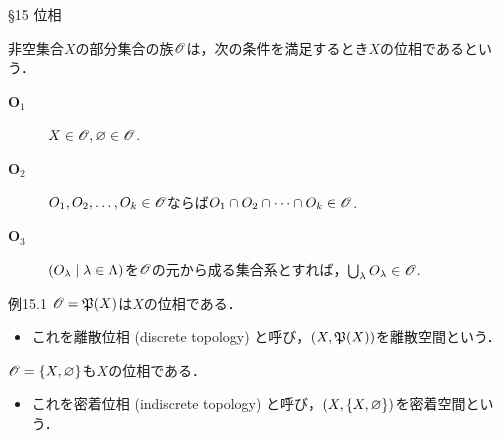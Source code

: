 \documentclass[uplatex,a4paper,dvipdfmx,aspectratio=169,11pt]{beamer}
\begin{document}
\begin{frame}[fragile]{\S 15 位相}
    \begin{block}{}
        非空集合$X$の部分集合の族$\mathscr{O}$は，次の条件を満足するとき$X$の\alert{位相}であるという．
       \begin{description}
           \item[$\textbf{O}_1$] $X \in \mathscr{O}, \varnothing \in \mathscr{O}$.
           \item[$\textbf{O}_2$] $O_1, O_2, \ldots, O_k \in \mathscr{O}$ならば$O_1 \cap O_2 \cap \dots \cap O_k \in \mathscr{O}$.
           \item[$\textbf{O}_3$] $\qty(O_\lambda \mid \lambda \in \Lambda)$を$\mathscr{O}$の元から成る集合系とすれば，$\bigcup_\lambda O_\lambda \in \mathscr{O}$.
       \end{description} 
    \end{block}

    \medskip{}

    \begin{exampleblock}{例15.1}
        $\mathscr{O} = \mathord{\mathfrak{P}}\qty(X)$は$X$の位相である．
        \begin{itemize}
            \item これを\alert{離散位相} (discrete topology) と呼び，$(X, \mathord{\mathfrak{P}}\qty(X))$を\alert{離散空間}という．
        \end{itemize}
        $\mathscr{O} = \qty{X, \varnothing}$も$X$の位相である．
        \begin{itemize}
            \item これを\alert{密着位相} (indiscrete topology) と呼び，$(X, \qty{X, \varnothing})$を\alert{密着空間}という．
        \end{itemize}
    \end{exampleblock}
\end{frame}
\end{document}
